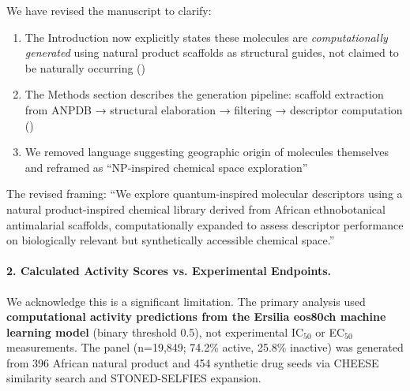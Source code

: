 \documentclass[11pt]{article}
\begin{document}
We have revised the manuscript to clarify:
\begin{enumerate}[label=\alph*),leftmargin=1.6em]
\item The Introduction now explicitly states these molecules are \textit{computationally 
generated} using natural product scaffolds as structural guides, not claimed to be 
naturally occurring ()
\item The Methods section describes the generation pipeline: scaffold extraction from 
ANPDB → structural elaboration → filtering → descriptor computation ()
\item We removed language suggesting geographic origin of molecules themselves and 
reframed as ``NP-inspired chemical space exploration''
\end{enumerate}

The revised framing: ``We explore quantum-inspired molecular descriptors using a 
natural product-inspired chemical library derived from African ethnobotanical antimalarial 
scaffolds, computationally expanded to assess descriptor performance on biologically 
relevant but synthetically accessible chemical space.''

\paragraph{2. Calculated Activity Scores vs. Experimental Endpoints.}
We acknowledge this is a significant limitation. The primary analysis used \textbf{computational 
activity predictions from the Ersilia eos80ch machine learning model} (binary threshold 0.5), 
not experimental IC$_{50}$ or EC$_{50}$ measurements. The panel (n=19,849; 74.2\% active, 
25.8\% inactive) was generated from 396 African natural product and 454 synthetic drug seeds 
via CHEESE similarity search and STONED-SELFIES expansion.
\end{document}
